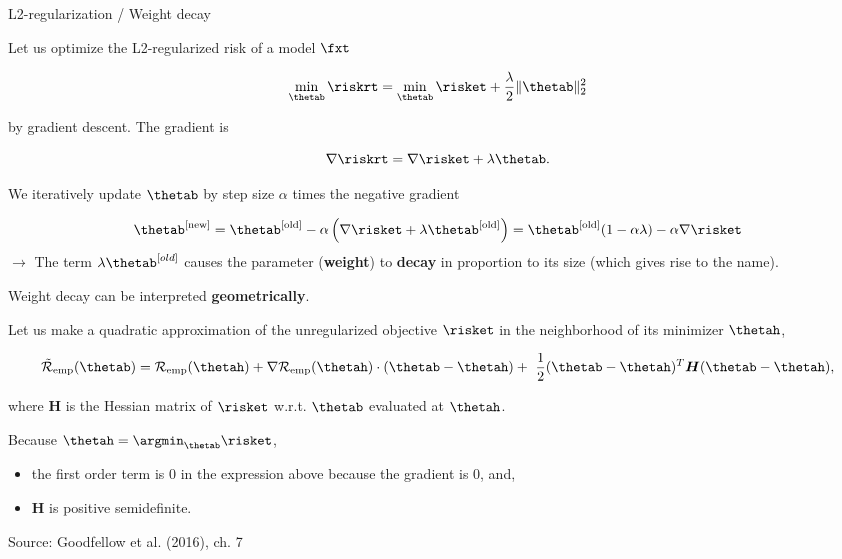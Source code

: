 
\begin{vbframe}{L2-regularization / Weight decay}

Let us optimize the L2-regularized risk of a model $\fxt$

\[
\min_{\thetab} \riskrt = \min_{\thetab} \risket + \frac{\lambda}{2} \|\thetab\|^2_2
\]

by gradient descent. The gradient is

\[
\nabla \riskrt = \nabla \risket + \lambda \thetab.
\]

We iteratively update $\thetab$ by step size \(\alpha\) times the
negative gradient

\[
\thetab^{[\text{new}]} = \thetab^{[\text{old}]} - \alpha \left(\nabla \risket + \lambda \thetab^{[\text{old}]}\right) =
\thetab^{[\text{old}]} (1 - \alpha \lambda) - \alpha \nabla \risket
\]
$\to$ The term \(\lambda \thetab^{[old]}\) causes the parameter
(\textbf{weight}) to \textbf{decay} in proportion to its size (which gives rise to the name). %

\framebreak

Weight decay can be interpreted \textbf{geometrically}. 

\lz 

Let us make a quadratic approximation of the unregularized objective $\risket$ in the neighborhood of its minimizer $\thetah$,  

$$ \mathcal{\tilde R}_{\text{emp}}(\thetab)= \mathcal{R}_{\text{emp}}(\thetah) + \nabla \mathcal{R}_{\text{emp}}(\thetah)\cdot(\thetab - \thetah) + \ \frac{1}{2} (\thetab - \thetah)^T \bm{H} (\thetab - \thetah), $$

where $\bm{H}$ is the Hessian matrix of $\risket$ w.r.t. $\thetab$ evaluated at $\thetah$. 

\lz

Because $\thetah = \argmin_{\thetab}\risket$,
\begin{itemize}
  \item the first order term is 0 in the expression above because the gradient is $0$, and,
  \item $\bm{H}$ is positive semidefinite.
\end{itemize}

\lz

\tiny{Source: Goodfellow et al. (2016), ch. 7}


\end{vbframe}
